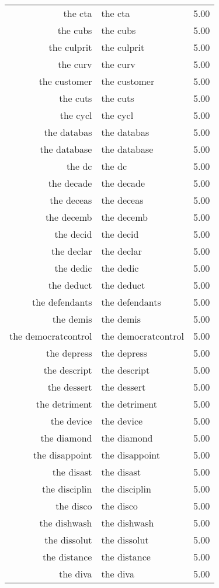 \begin{table}[ht]
\begin{tabular}{rlr}
  the cta & the cta & 5.00 \\ 
  the cubs & the cubs & 5.00 \\ 
  the culprit & the culprit & 5.00 \\ 
  the curv & the curv & 5.00 \\ 
  the customer & the customer & 5.00 \\ 
  the cuts & the cuts & 5.00 \\ 
  the cycl & the cycl & 5.00 \\ 
  the databas & the databas & 5.00 \\ 
  the database & the database & 5.00 \\ 
  the dc & the dc & 5.00 \\ 
  the decade & the decade & 5.00 \\ 
  the deceas & the deceas & 5.00 \\ 
  the decemb & the decemb & 5.00 \\ 
  the decid & the decid & 5.00 \\ 
  the declar & the declar & 5.00 \\ 
  the dedic & the dedic & 5.00 \\ 
  the deduct & the deduct & 5.00 \\ 
  the defendants & the defendants & 5.00 \\ 
  the demis & the demis & 5.00 \\ 
  the democratcontrol & the democratcontrol & 5.00 \\ 
  the depress & the depress & 5.00 \\ 
  the descript & the descript & 5.00 \\ 
  the dessert & the dessert & 5.00 \\ 
  the detriment & the detriment & 5.00 \\ 
  the device & the device & 5.00 \\ 
  the diamond & the diamond & 5.00 \\ 
  the disappoint & the disappoint & 5.00 \\ 
  the disast & the disast & 5.00 \\ 
  the disciplin & the disciplin & 5.00 \\ 
  the disco & the disco & 5.00 \\ 
  the dishwash & the dishwash & 5.00 \\ 
  the dissolut & the dissolut & 5.00 \\ 
  the distance & the distance & 5.00 \\ 
  the diva & the diva & 5.00 \\ 

\end{tabular}
\end{table}

